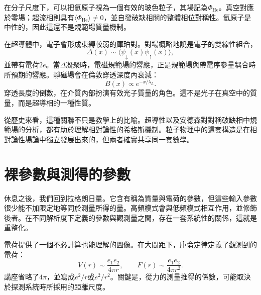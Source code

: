 在分子尺度下，可以把氦原子視為一個有效的玻色粒子，其場記為\(\Phi_{\mathrm{He}}\)。真空對應於零場；超流相則具有\(\langle\Phi_{\mathrm{He}}\rangle\ne0\)，並自發破缺相關的整體相位對稱性。氦原子是中性的，因此這還不是規範場質量機制。

在超導體中，電子會形成束縛較弱的庫珀對。對場概略地說是電子的雙線性組合，
\begin{equation}
  \Delta(x)\sim\langle\psi_\downarrow(x)\psi_\uparrow(x)\rangle,
  \label{eq:l10-cooper-order-parameter}
\end{equation}
並帶有電荷\(2e\)。當\(\Delta\)凝聚時，電磁規範場的響應，正是規範場與帶電序參量耦合時所預期的響應。靜磁場會在倫敦穿透深度內衰減：
\begin{equation}
  B(x)\propto e^{-x/\lambda_L}.
  \label{eq:l10-meissner-screening}
\end{equation}
穿透長度的倒數，在介質內部扮演有效光子質量的角色。這不是光子在真空中的質量，而是超導相的一種性質。

\begin{classroomqa}
\end{classroomqa}

從歷史來看，這種關聯不只是教學上的比喻。超導性以及安德森對對稱破缺相中規範場的分析，都有助於理解相對論性的希格斯機制。粒子物理中的這套構造是在相對論性場論中獨立發展出來的，但兩者確實共享同一套數學。

\section{裸參數與測得的參數}

休息之後，我們回到拉格朗日量。它含有稱為質量與電荷的參數，但這些輸入參數很少能不加限定地等同於測量所得的量。高頻模式會與低頻模式相互作用，並修飾後者。在不同解析度下定義的參數與觀測量之間，存在一套系統性的關係，這就是重整化。

電荷提供了一個不必計算也能理解的圖像。在大間距下，庫侖定律定義了觀測到的電荷：
\begin{equation}
  V(r)\sim\frac{e_1e_2}{4\pi r},
  \qquad
  F(r)\sim\frac{e_1e_2}{4\pi r^2}.
  \label{eq:l10-coulomb-law}
\end{equation}
講座省略了\(4\pi\)，並寫成\(e^2/r\)或\(e^2/r^2\)。關鍵是，從力的測量推得的係數，可能取決於探測系統時所採用的距離尺度。

